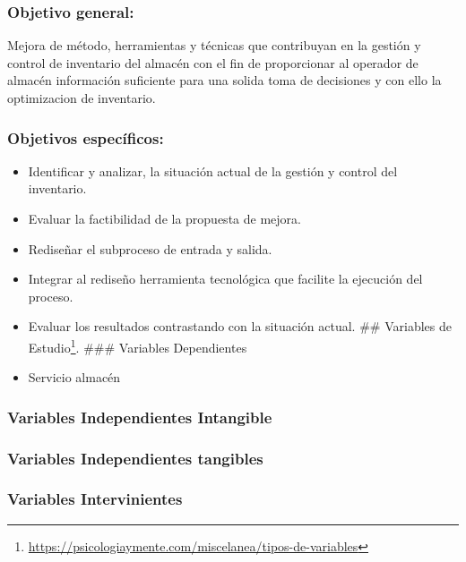 \documentclass[
]{article}
\begin{document}
\hypertarget{objetivo-general}{%
\subsubsection{Objetivo general:}\label{objetivo-general}}

Mejora de método, herramientas y técnicas que contribuyan en la gestión
y control de inventario del almacén con el fin de proporcionar al
operador de almacén información suficiente para una solida toma de
decisiones y con ello la optimizacion de inventario.

\hypertarget{objetivos-especuxedficos}{%
\subsubsection{Objetivos específicos:}\label{objetivos-especuxedficos}}

\begin{itemize}
\item
  Identificar y analizar, la situación actual de la gestión y control
  del inventario.
\item
  Evaluar la factibilidad de la propuesta de mejora.
\item
  Rediseñar el subproceso de entrada y salida.
\item
  Integrar al rediseño herramienta tecnológica que facilite la ejecución
  del proceso.
\item
  Evaluar los resultados contrastando con la situación actual. \#\#
  Variables de Estudio\footnote{\url{https://psicologiaymente.com/miscelanea/tipos-de-variables}}.
  \#\#\# Variables Dependientes
\item
  Servicio almacén
\end{itemize}

\hypertarget{variables-independientes-intangible}{%
\subsubsection{Variables Independientes
Intangible}\label{variables-independientes-intangible}}

\hypertarget{variables-independientes-tangibles}{%
\subsubsection{Variables Independientes
tangibles}\label{variables-independientes-tangibles}}

\hypertarget{variables-intervinientes}{%
\subsubsection{Variables
Intervinientes}\label{variables-intervinientes}}
\end{document}
